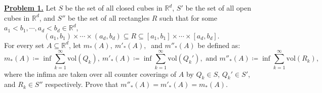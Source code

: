 \noindent \underline{\textbf{Problem 1.}} Let \( S \) be the set of all closed cubes in \( \mathbb{R}^{d}  \), \( S' \) be the set of all open cubes in \( \mathbb{R}^{d}  \), and \( S'' \) be the set of all rectangles \( R \) such that for some \( a_1 < b_1, \cdots , a_d < b_d \in \mathbb{R}^{d}  \), \[(a_1, b_1) \times \cdots \times (a_d,b_d) \subseteq R \subseteq [a_1, b_1] \times \cdots \times [a_d,b_d].\] For every set \( A \subseteq \mathbb{R}^{d}  \), let \( m_*(A), \ m'_*(A), \  \) and \( m''_*(A) \) be defined as: \[ m_*(A) \coloneqq \inf \sum_{k=1}^{\infty} \mbox{vol}(Q_k), \ m'_*(A) \coloneqq \inf \sum_{k=1}^{\infty}\mbox{vol}(Q_k'), \mbox{ and } m''_*(A) \coloneqq \inf \sum_{k=1}^{\infty} \mbox{vol}(R_k),\] where the infima are taken over all counter coverings of \( A \) by \( Q_k \in S \), \( Q_k' \in S' \), and \( R_k \in S'' \) respectively. Prove that \( m''_*(A) = m'_*(A) = m_*(A) \).

